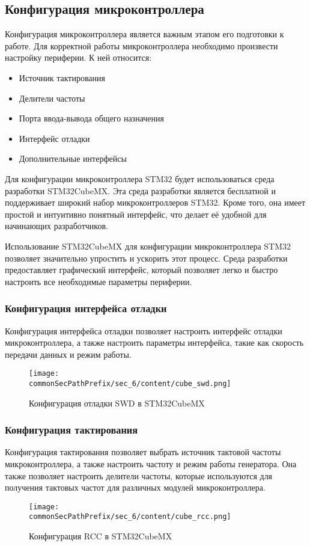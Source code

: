 \subsection{Конфигурация микроконтроллера}
Конфигурация микроконтроллера является важным этапом его подготовки к работе. Для корректной работы микроконтроллера необходимо произвести настройку периферии. К ней относится:
\begin{itemize}
    \item Источник тактирования
    \item Делители частоты
    \item Порта ввода-вывода общего назначения
    \item Интерфейс отладки
    \item Дополнительные интерфейсы
\end{itemize}
Для конфигурации микроконтроллера STM32 будет использоваться среда разработки STM32CubeMX. Эта среда разработки является бесплатной и поддерживает широкий набор микроконтроллеров STM32. Кроме того, она имеет простой и интуитивно понятный интерфейс, что делает её удобной для начинающих разработчиков.

Использование STM32CubeMX для конфигурации микроконтроллера STM32 позволяет значительно упростить и ускорить этот процесс. Среда разработки предоставляет графический интерфейс, который позволяет легко и быстро настроить все необходимые параметры периферии.

\subsubsection{Конфигурация интерфейса отладки}
Конфигурация интерфейса отладки позволяет настроить интерфейс отладки микроконтроллера, а также настроить параметры интерфейса, такие как скорость передачи данных и режим работы. 
\begin{figure}[ht]
    \centering
    \texttt{[image: \\commonSecPathPrefix/sec\_6/content/cube\_swd.png]}
    \caption{Конфигурация отладки SWD в STM32CubeMX}
\end{figure}

\subsubsection{Конфигурация тактирования}
Конфигурация тактирования позволяет выбрать источник тактовой частоты микроконтроллера, а также настроить частоту и режим работы генератора. Она также позволяет настроить делители частоты, которые используются для получения тактовых частот для различных модулей микроконтроллера.
\begin{figure}[ht]
    \centering
    \texttt{[image: \\commonSecPathPrefix/sec\_6/content/cube\_rcc.png]}
    \caption{Конфигурация RCC в STM32CubeMX}
\end{figure}

